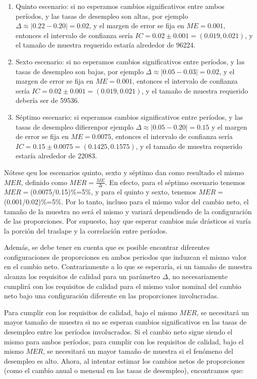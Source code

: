 \documentclass[
  12pt,
]{book}
\begin{document}
\begin{enumerate}
\def\labelenumi{\arabic{enumi}.}
\setcounter{enumi}{4}
\item
  Quinto escenario: si no esperamos cambios significativos entre ambos períodos, y las tasas de desempleo son altas, por ejemplo \(\Delta \approx |0.22-0.20|=0.02\), y el margen de error se fija en \(ME = 0.001\), entonces el intervalo de confianza sería \(IC=0.02 \pm 0.001=(0.019,0.021)\), y el tamaño de muestra requerido estaría alrededor de 96224.
\item
  Sexto escenario: si no esperamos cambios significativos entre períodos, y las tasas de desempleo son bajas, por ejemplo \(\Delta \approx |0.05-0.03| =0.02\), y el margen de error se fija en \(ME = 0.001\), entonces el intervalo de confianza sería \(IC=0.02\pm0.001=(0.019,0.021)\), y el tamaño de muestra requerido debería ser de 59536.
\item
  Séptimo escenario: si esperamos cambios significativos entre períodos, y las tasas de desempleo difierenpor ejemplo \(\Delta \approx|0.05-0.20|=0.15\) y el margen de error se fija en \(ME = 0.0075\), entonces el intervalo de confianza sería \(IC=0.15\pm0.0075=(0.1425,0.1575)\), y el tamaño de muestra requerido estaría alrededor de 22083.
\end{enumerate}

Nótese qeu los escenarios quinto, sexto y séptimo dan como resultado el mismo \(MER\), definido como
\(MER=\frac{ME}{\mathrm{\Delta}}\). En efecto, para el séptimo escenario tenemos \(MER=\)(0.0075/0.15)\%=5\%, y para el quinto y sexto, tenemos \(MER=\)(0.001/0.02)\%=5\%. Por lo tanto, incluso para el mismo valor del cambio neto, el tamaño de la muestra no será el mismo y variará dependiendo de la configuración de las proporciones. Por supuesto, hay que esperar cambios más drásticos si varía la porción del traslape y la correlación entre períodos.

Además, se debe tener en cuenta que es posible encontrar diferentes configuraciones de proporciones en ambos periodos que induzcan el mismo valor en el cambio neto. Contrariamente a lo que se esperaría, si un tamaño de muestra alcanza los requisitos de calidad para un parámetro \(\Delta\), no necesariamente cumplirá con los requisitos de calidad para el mismo valor nominal del cambio neto bajo una configuración diferente en las proporciones involucradas.

Para cumplir con los requisitos de calidad, bajo el mismo \(MER\), se necesitará un mayor tamaño de muestra si no se esperan cambios significativos en las tasas de desempleo entre los períodos involucrados. Si el cambio neto sigue siendo el mismo para ambos períodos, para cumplir con los requisitos de calidad, bajo el mismo \(MER\), se necesitará un mayor tamaño de muestra si el fenómeno del desempleo es alto. Ahora, al intentar estimar los cambios netos de proporciones (como el cambio anual o mensual en las tasas de desempleo), encontramos que:
\end{document}
